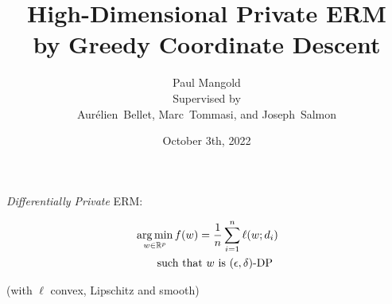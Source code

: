 \documentclass{beamer}
\title{\huge High-Dimensional Private ERM \\ by Greedy Coordinate Descent}
\author{
  Paul Mangold \\[1em]
 Supervised by \\ Aurélien~Bellet, Marc~Tommasi, and Joseph~Salmon
}
\institute{\textsc{LOL 2022}}
\date{October 3th, 2022}
\begin{document}

\begin{notitle}
  \begin{frame}
    \titlepage
  \end{frame}
  \addtocounter{framenumber}{-1}
\end{notitle}







\begin{frame}
  \vspace{2em}

  {\Huge
    \textit{Differentially Private} ERM:
  }

  \vspace{-1em}

  \begin{align*}
    & \operatorname*{arg\,min}_{w \in \mathbb R^p}  f(w) = \frac 1n \sum_{i=1}^n \ell(w; d_i) \\
    & \qquad \text{\relax{such that $w$ is $(\epsilon, \delta)$-DP}}
  \end{align*}
  {
    \begin{center}
      (with $\ell$ convex, Lipschitz and smooth)
    \end{center}
  }
\end{frame}
\end{document}
